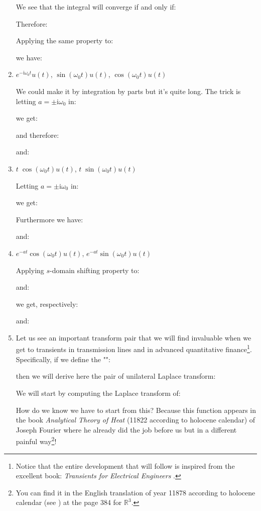 \begin{enumerate}
		We see that the integral will converge if and only if:
		
		Therefore:
		
		Applying the same property to:
		
		we have:
		
		
		\item $e^{-\mathrm{i}\omega_0 t}u(t)$, $\sin(\omega_0 t)u(t)$, $\cos(\omega_0 t)u(t)$
		
		We could make it by integration by parts but it's quite long. The trick is letting $a=\pm \mathrm{i}\omega_0$ in:
		
		we get:
		
		and therefore:
		
		and:
		
		
		\item $t\;\cos(\omega_0 t)u(t)$, $t\;\sin(\omega_0 t)u(t)$ 
		
		Letting $a=\pm \mathrm{i}\omega_0$ in:
		
		we get:
		
		Furthermore we have:
		
		and:
		
		
		\item $e^{-at}\cos(\omega_0 t) u(t)$,  $e^{-at}\sin(\omega_0 t) u(t)$  
		
		Applying $s$-domain shifting property to:
		
		and:
		
		we get, respectively:
		
		and:
		
		
		\item \label{Laplace pair for finance and telegrapher equation}Let us see an important transform pair that we will find invaluable when we get to transients in transmission lines and in advanced quantitative finance\footnote{ Notice that the entire development that will follow is inspired from the excellent book: \textit{Transients for Electrical Engineers} \pageref{nahin2018transients}.}. Specifically, if we define the "":
		
		then we will derive here the pair of unilateral Laplace transform:
		
		\begin{dem}
		We will start by computing the Laplace transform of:
		
		How do we know we have to start from this? Because this function appears in the book \textit{Analytical Theory of Heat} (11822 according to holocene calendar) of Joseph Fourier where he already did the job before us but in a different painful way\footnote{You can find it in the English translation of year 11878 according to holocene calendar (see \cite{fourier2003analytical}) at the page 384 for $\mathbb{R}^3$.}!
		

\end{dem}
\end{enumerate}
